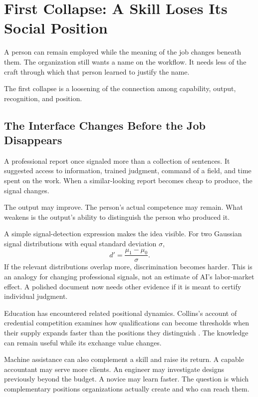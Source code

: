 \section{First Collapse: A Skill Loses Its Social Position}

A person can remain employed while the meaning of the job changes beneath them. The organization still wants a name on the workflow. It needs less of the craft through which that person learned to justify the name.

The first collapse is a loosening of the connection among capability, output, recognition, and position.

\subsection{The Interface Changes Before the Job Disappears}

A professional report once signaled more than a collection of sentences. It suggested access to information, trained judgment, command of a field, and time spent on the work. When a similar-looking report becomes cheap to produce, the signal changes.

The output may improve. The person's actual competence may remain. What weakens is the output's ability to distinguish the person who produced it.

A simple signal-detection expression makes the idea visible. For two Gaussian signal distributions with equal standard deviation $\sigma$,
\begin{equation}
 d'=\frac{\mu_1-\mu_0}{\sigma}.
\end{equation}
If the relevant distributions overlap more, discrimination becomes harder. This is an analogy for changing professional signals, not an estimate of AI's labor-market effect. A polished document now needs other evidence if it is meant to certify individual judgment.

Education has encountered related positional dynamics. Collins's account of credential competition examines how qualifications can become thresholds when their supply expands faster than the positions they distinguish \cite{collins1979credential}. The knowledge can remain useful while its exchange value changes.

Machine assistance can also complement a skill and raise its return. A capable accountant may serve more clients. An engineer may investigate designs previously beyond the budget. A novice may learn faster. The question is which complementary positions organizations actually create and who can reach them.

